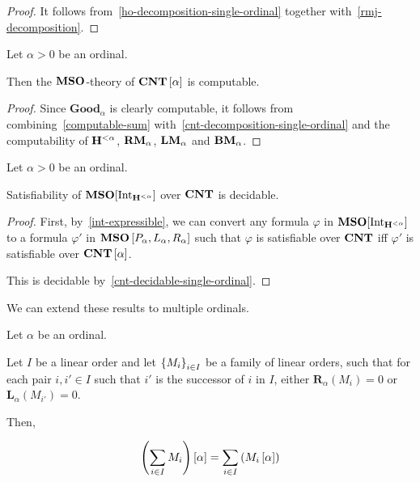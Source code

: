 \begin{proof}
  It follows from~\cref{ho-decomposition-single-ordinal}
  together with~\cref{rmj-decomposition}.
\end{proof}

\begin{lemma}\label{cnt-decidable-single-ordinal}
  Let $\alpha > 0$ be an ordinal.

  Then the $\mathbf{MSO}$-theory of $\mathbf{CNT} \left[ {\alpha} \right]$ is computable.
\end{lemma}

\begin{proof}
  Since $\mathbf{Good}_{\alpha}$ is clearly computable,
  it follows from combining~\cref{computable-sum}
  with~\cref{cnt-decomposition-single-ordinal}
  and the computability of $\mathbf{H}^{< \alpha}$,
  $\mathbf{RM}_{\alpha}$, $\mathbf{LM}_{\alpha}$ and $\mathbf{BM}_{\alpha}$.
\end{proof}

\begin{theorem}\label{single-ordinal-satisfiability}
  Let $\alpha > 0$ be an ordinal.

  Satisfiability of $\mathbf{MSO}[\mathrm{Int}_{\mathbf{H}^{< \alpha}}]$
  over $\mathbf{CNT}$ is decidable.
\end{theorem}

\begin{proof}
  First, by~\cref{int-expressible}, we can convert
  any formula $\varphi$ in $\mathbf{MSO}[\mathrm{Int}_{\mathbf{H}^{< \alpha}}]$
  to a formula $\varphi'$ in $\mathbf{MSO} \left[ {P_\alpha, L_\alpha, R_\alpha} \right]$
  such that $\varphi$ is satisfiable over $\mathbf{CNT}$
  iff $\varphi'$ is satisfiable over $\mathbf{CNT} \left[ {\alpha} \right]$.

  This is decidable by~\cref{cnt-decidable-single-ordinal}.
\end{proof}

We can extend these results to multiple ordinals.

\begin{lemma}\label{extend-lemma-single-ordinal}
  Let $\alpha$ be an ordinal.

  Let $I$ be a linear order
  and let $\left\{ {M_i} \right\}_{i \in I}$ be a family of linear orders,
  such that for each pair $i, i' \in I$
  such that $i'$ is the successor of $i$ in $I$,
  either $\mathbf{R}_\alpha(M_{i}) = 0$ or $\mathbf{L}_\alpha(M_{i'}) = 0$.

  Then,

  \[
    \left( { \sum_{i \in I} M_i } \right) \left[ {\alpha} \right] = \sum_{i \in I} \left( { M_i \left[ {\alpha} \right] } \right)
  \]
\end{lemma}


